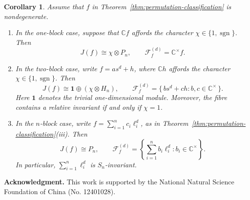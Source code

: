 \documentclass[11pt,reqno]{amsart}
\numberwithin{equation}{section}
\newtheorem{corollary}[theorem]{Corollary}
\theoremstyle{definition}
\theoremstyle{remark}
\newcommand{\C}{\mathbb C}
\newcommand{\Triv}{\mathbf 1}
\newcommand{\sgn}{\operatorname{sgn}}
\newcommand{\cF}{\mathcal F}
\begin{document}
\begin{corollary}
\label{cor:permutation-Xi}
Assume that $f$ in
Theorem~\ref{thm:permutation-classification} is nondegenerate.

\begin{enumerate}[label=\textup{(\roman*)},leftmargin=0.9cm]

\item
In the one-block case, suppose that $\C f$ affords the character
$\chi\in\{1,\sgn\}$.  Then
\[
  J(f)\cong\chi\otimes P_n,
  \qquad
  \cF_f^{(d)}=\C^\times f.
\]

\item
In the two-block case, write $f=a s^d+h$, where $\C h$ affords the character
$\chi\in\{1,\sgn\}$.  Then
\[
  J(f)
  \cong
  \Triv\oplus(\chi\otimes H_n),
  \qquad
  \cF_f^{(d)}
  =
  \{\,b s^d+c h:b,c\in\C^\times\,\}.
\]
Here $\Triv$ denotes the trivial one-dimensional module.  Moreover,
the fibre contains a relative invariant if and only if $\chi=1$.

\item
In the $n$-block case, write $f=\sum_{i=1}^n c_i\ell_i^d$, as in Theorem~\ref{thm:permutation-classification}\textup{(iii)}. Then
\[
  J(f)\cong P_n,
  \qquad
  \cF_f^{(d)}
  =
  \left\{
    \sum_{i=1}^n b_i\ell_i^d:
    b_i\in\C^\times
  \right\}.
\]
In particular,  $\sum_{i=1}^n\ell_i^d$ is $S_n$-invariant.
\end{enumerate}
\end{corollary}



\bigskip
\noindent
\textbf{Acknowledgment.}
 This work is supported by the National Natural 
Science Foundation of China (No. 12401028).
\end{document}
